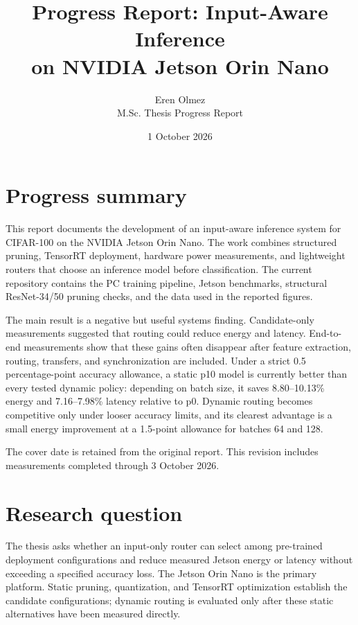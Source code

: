 \documentclass[11pt,a4paper]{article}
\title{\textbf{Progress Report: Input-Aware Inference\\on NVIDIA Jetson Orin Nano}}
\author{Eren Olmez\\M.Sc. Thesis Progress Report}
\date{1 October 2026}
\begin{document}
\maketitle
\vspace{-1.2em}



\section{Progress summary}

This report documents the development of an input-aware inference system for CIFAR-100 on the NVIDIA Jetson Orin Nano. The work combines structured pruning, TensorRT deployment, hardware power measurements, and lightweight routers that choose an inference model before classification. The current repository contains the PC training pipeline, Jetson benchmarks, structural ResNet-34/50 pruning checks, and the data used in the reported figures.

The main result is a negative but useful systems finding. Candidate-only measurements suggested that routing could reduce energy and latency. End-to-end measurements show that these gains often disappear after feature extraction, routing, transfers, and synchronization are included. Under a strict 0.5 percentage-point accuracy allowance, a static p10 model is currently better than every tested dynamic policy: depending on batch size, it saves 8.80--10.13\% energy and 7.16--7.98\% latency relative to p0. Dynamic routing becomes competitive only under looser accuracy limits, and its clearest advantage is a small energy improvement at a 1.5-point allowance for batches 64 and 128.

The cover date is retained from the original report. This revision includes measurements completed through 3 October 2026.

\section{Research question}

The thesis asks whether an input-only router can select among pre-trained deployment configurations and reduce measured Jetson energy or latency without exceeding a specified accuracy loss. The Jetson Orin Nano is the primary platform. Static pruning, quantization, and TensorRT optimization establish the candidate configurations; dynamic routing is evaluated only after these static alternatives have been measured directly.
\end{document}
